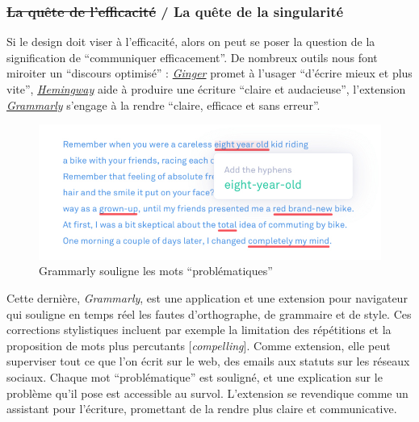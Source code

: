 \documentclass[]{article}
\begin{document}
\newpage

\hypertarget{la-quuxeate-de-lefficacituxe9-la-quuxeate-de-la-singularituxe9}{%
\subsubsection{\texorpdfstring{\sout{La quête de l'efficacité} / La
quête de la
singularité}{La quête de l'efficacité / La quête de la singularité}}\label{la-quuxeate-de-lefficacituxe9-la-quuxeate-de-la-singularituxe9}}

Si le design doit viser à l'efficacité, alors on peut se poser la
question de la signification de ``communiquer efficacement''. De
nombreux outils nous font miroiter un ``discours optimisé'' :
\href{http://www.gingersoftware.com/fr}{\emph{Ginger}} promet à l'usager
``d'écrire mieux et plus vite'',
\href{http://www.hemingwayapp.com/}{\emph{Hemingway}} aide à produire
une écriture ``claire et audacieuse'', l'extension
\href{https://www.grammarly.com/}{\emph{Grammarly}} s'engage à la rendre
``claire, efficace et sans erreur''.

\begin{figure}
\centering
\includegraphics{./tex2pdf.9048/7e83c21e6796d91bba646886acdde75e134357da.jpg}
\caption{Grammarly souligne les mots ``problématiques''}
\end{figure}

Cette dernière, \emph{Grammarly}, est une application et une extension
pour navigateur qui souligne en temps réel les fautes d'orthographe, de
grammaire et de style. Ces corrections stylistiques incluent par exemple
la limitation des répétitions et la proposition de mots plus percutants
{[}\emph{compelling}{]}. Comme extension, elle peut superviser tout ce
que l'on écrit sur le web, des emails aux statuts sur les réseaux
sociaux. Chaque mot ``problématique'' est souligné, et une explication
sur le problème qu'il pose est accessible au survol. L'extension se
revendique comme un assistant pour l'écriture, promettant de la rendre
plus claire et communicative.
\end{document}
